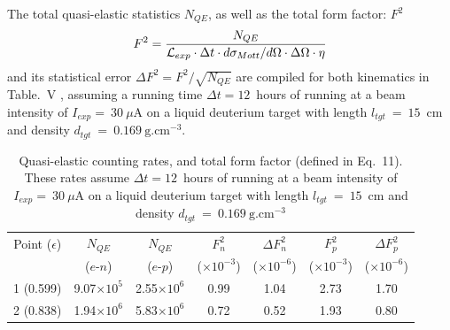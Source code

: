 The total quasi-elastic statistics $N_{QE}$, as well as the total form factor: $F^2$
%
\begin{equation}
  F^2 = \frac{N_{QE}}{{\cal{L}}_{exp} \cdot \Delta t \cdot  d\sigma_{Mott}/d\Omega  \cdot \Delta\Omega \cdot  \eta}
  \label{eq:F2}
\end{equation}
%
and its statistical error $\Delta F^2 = F^2/\sqrt{N_{QE}}$ are compiled for both kinematics in Table.~V%
, assuming a running time $\Delta t = 12$~hours of running at a beam intensity of $I_{exp} =~30~\mu$A on a liquid deuterium target with length $l_{tgt}~=~15$~cm and density $d_{tgt}~=~0.169~\mathrm{g.cm}^{-3}$.
%
\begin{center}
\begin{table}[h]
\begin{tabular}{|c|c|c|c|c|c|c|}
\hline
Point ($\epsilon$) & $N_{QE}$ & $N_{QE}$ & $F^2_n$ & $\Delta F^2_n$ & $F^2_p$ & $\Delta F^2_p$ \\
 &  ($e$-$n$) &  ($e$-$p$) & ($\times 10^{-3}$) & ($\times 10^{-6}$) & ($\times 10^{-3}$) & ($\times 10^{-6}$) \\
\hline
1 (0.599) & 9.07$\times 10^{5}$ & 2.55$\times 10^{6}$ & 0.99 & 1.04 & 2.73 & 1.70 \\
\hline
2 (0.838) & 1.94$\times 10^{6}$ & 5.83$\times 10^{6}$ & 0.72 & 0.52 & 1.93 & 0.80 \\
\hline
\end{tabular} 
\caption{Quasi-elastic counting rates, and total form factor (defined in Eq.~11). %
  These rates assume $\Delta t = 12$~hours of running at a beam intensity of $I_{exp} =~30~\mu$A on a liquid deuterium target with length $l_{tgt}~=~15$~cm and density $d_{tgt}~=~0.169~\mathrm{g.cm}^{-3}$}%
\label{tab:Rates}
\end{table}
\end{center}
%

